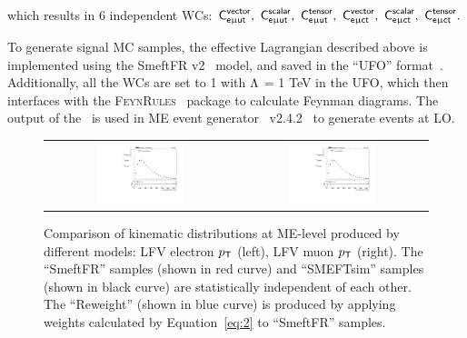 which results in 6 independent \acp{WC}: $\textsf{C}^{\textsf{vector}}_{\textsf{e}\upmu\textsf{{u}t}},~\textsf{C}^{\textsf{scalar}}_{\textsf{e}\upmu\textsf{{u}t}},~\textsf{C}^{\textsf{tensor}}_{\textsf{e}\upmu\textsf{{u}t}},~\textsf{C}^{\textsf{vector}}_{\textsf{e}\upmu\textsf{{c}t}},~\textsf{C}^{\textsf{scalar}}_{\textsf{e}\upmu\textsf{{c}t}},~\textsf{C}^{\textsf{tensor}}_{\textsf{e}\upmu\textsf{{c}t}}.$  

To generate signal \ac{MC} samples, the effective Lagrangian described above is implemented using the SmeftFR v2~\cite{Dedes:2019uzs} model, and saved in the ``UFO'' format~\cite{Degrande:2011ua}. Additionally, all the \acp{WC} are set to 1 with $\mathrm{\Lambda}$ = 1 TeV in the UFO, which then interfaces with the \textsc{FeynRules}~\cite{Christensen:2008py} package to calculate Feynman diagrams. The output of the \FR~is used in \ac{ME} event generator \MG~v2.4.2~\cite{Alwall:2014hca} to generate events at \ac{LO}. 

\begin{figure}[tbh!]
 \begin{center}
 \begin{tabular}{cc}
 \includegraphics[width=0.48\textwidth]{figures/Part3/Samples/LFVePt}&
  \includegraphics[width=0.48\textwidth]{figures/Part3/Samples/LFVmuPt}\\
 \end{tabular}
 \caption{Comparison of kinematic distributions at \ac{ME}-level produced by different models: LFV electron $p_{\textsf{T}}$ (left), LFV muon $p_{\textsf{T}}$ (right). The ``SmeftFR'' samples (shown in red curve) and ``SMEFTsim'' samples (shown in black curve) are statistically independent of each other. The ``Reweight'' (shown in blue curve) is produced by applying weights calculated by Equation~\ref{eq:2} to ``SmeftFR'' samples.}
 \label{fig:reweight}
 \end{center}
\end{figure}

